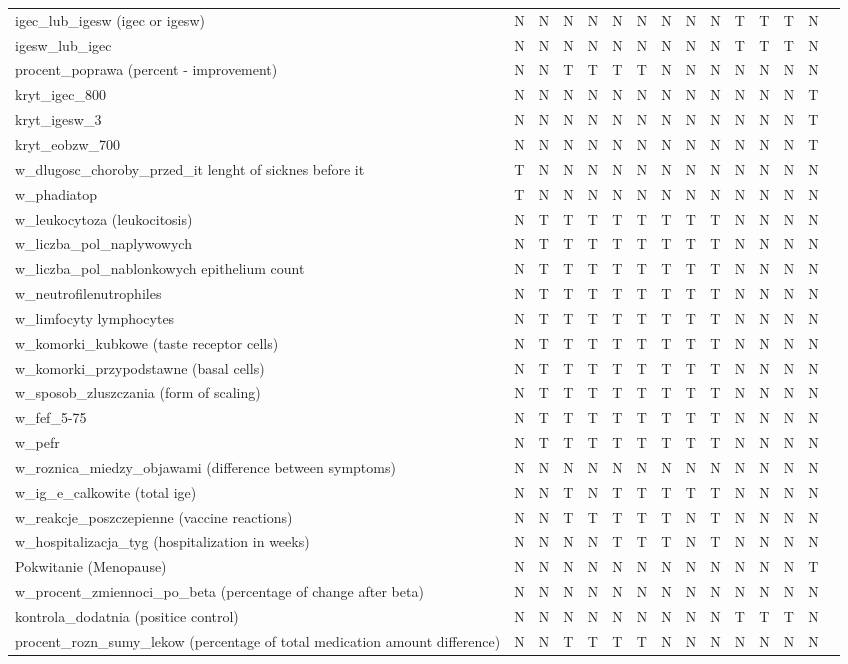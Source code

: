 \documentclass[10pt,oneside]{memoir}
\begin{document}
\begin{table}[htbp]
\begin{minipage}{\linewidth}
\begin{tabulary}{\linewidth}{@{}l@{}l@{}l@{}l@{}l@{}l@{}l@{}l@{}l@{}l@{}l@{}l@{}l@{}l@{}l@{}}
igec\_lub\_igesw (igec or igesw)&N&N&N&N&N&N&N&N&N&T&T&T&N \\
igesw\_lub\_igec&N&N&N&N&N&N&N&N&N&T&T&T&N \\
procent\_poprawa (percent - improvement)&N&N&T&T&T&T&N&N&N&N&N&N&N \\
kryt\_igec\_800&N&N&N&N&N&N&N&N&N&N&N&N&T \\
kryt\_igesw\_3&N&N&N&N&N&N&N&N&N&N&N&N&T \\
kryt\_eobzw\_700&N&N&N&N&N&N&N&N&N&N&N&N&T \\
w\_dlugosc\_choroby\_przed\_it lenght of sicknes before it&T&N&N&N&N&N&N&N&N&N&N&N&N \\
w\_phadiatop&T&N&N&N&N&N&N&N&N&N&N&N&N \\
w\_leukocytoza (leukocitosis)&N&T&T&T&T&T&T&T&T&N&N&N&N \\
w\_liczba\_pol\_naplywowych&N&T&T&T&T&T&T&T&T&N&N&N&N \\
w\_liczba\_pol\_nablonkowych epithelium count&N&T&T&T&T&T&T&T&T&N&N&N&N \\
w\_neutrofilenutrophiles&N&T&T&T&T&T&T&T&T&N&N&N&N \\
w\_limfocyty lymphocytes&N&T&T&T&T&T&T&T&T&N&N&N&N \\
w\_komorki\_kubkowe (taste receptor cells)&N&T&T&T&T&T&T&T&T&N&N&N&N \\
w\_komorki\_przypodstawne (basal cells)&N&T&T&T&T&T&T&T&T&N&N&N&N \\
w\_sposob\_zluszczania (form of scaling)&N&T&T&T&T&T&T&T&T&N&N&N&N \\
w\_fef\_5-75&N&T&T&T&T&T&T&T&T&N&N&N&N \\
w\_pefr&N&T&T&T&T&T&T&T&T&N&N&N&N \\
w\_roznica\_miedzy\_objawami (difference between symptoms)&N&N&N&N&N&N&N&N&N&N&N&N&N \\
w\_ig\_e\_calkowite (total ige)&N&N&T&N&T&T&T&T&T&N&N&N&N \\
w\_reakcje\_poszczepienne (vaccine reactions)&N&N&T&T&T&T&T&N&T&N&N&N&N \\
w\_hospitalizacja\_tyg (hospitalization in weeks)&N&N&N&N&T&T&T&N&T&N&N&N&N \\
Pokwitanie (Menopause)&N&N&N&N&N&N&N&N&N&N&N&N&T \\
w\_procent\_zmiennoci\_po\_beta (percentage of change after beta)&N&N&N&N&N&N&N&N&N&N&N&N&N \\
kontrola\_dodatnia (positice control)&N&N&N&N&N&N&N&N&N&T&T&T&N \\
procent\_rozn\_sumy\_lekow (percentage of total medication amount difference)&N&N&T&T&T&T&N&N&N&N&N&N&N \\

\end{tabulary}
\end{minipage}
\end{table}
\end{document}
